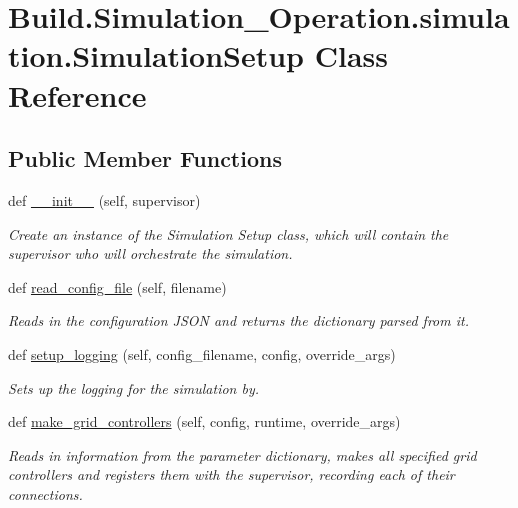 \hypertarget{class_build_1_1_simulation___operation_1_1simulation_1_1_simulation_setup}{}\section{Build.\+Simulation\+\_\+\+Operation.\+simulation.\+Simulation\+Setup Class Reference}
\label{class_build_1_1_simulation___operation_1_1simulation_1_1_simulation_setup}
\subsection*{Public Member Functions}
\begin{DoxyCompactItemize}
\item 
def \hyperlink{class_build_1_1_simulation___operation_1_1simulation_1_1_simulation_setup_a28c30509115384851598b77663c44d1f}{\+\_\+\+\_\+init\+\_\+\+\_\+} (self, supervisor)
\begin{DoxyCompactList}\small\item\em Create an instance of the Simulation Setup class, which will contain the supervisor who will orchestrate the simulation. \end{DoxyCompactList}\item 
def \hyperlink{class_build_1_1_simulation___operation_1_1simulation_1_1_simulation_setup_a7b0667f9c521eecef17941c07b091fa2}{read\+\_\+config\+\_\+file} (self, filename)
\begin{DoxyCompactList}\small\item\em Reads in the configuration J\+S\+ON and returns the dictionary parsed from it. \end{DoxyCompactList}\item 
def \hyperlink{class_build_1_1_simulation___operation_1_1simulation_1_1_simulation_setup_a62de4c30581cb63c774eef81689b0448}{setup\+\_\+logging} (self, config\+\_\+filename, config, override\+\_\+args)
\begin{DoxyCompactList}\small\item\em Sets up the logging for the simulation by. \end{DoxyCompactList}\item 
def \hyperlink{class_build_1_1_simulation___operation_1_1simulation_1_1_simulation_setup_a88f3f878c48354cc928642aa93e91aba}{make\+\_\+grid\+\_\+controllers} (self, config, runtime, override\+\_\+args)
\begin{DoxyCompactList}\small\item\em Reads in information from the parameter dictionary, makes all specified grid controllers and registers them with the supervisor, recording each of their connections. \end{DoxyCompactList}\item 

\end{DoxyCompactItemize}

